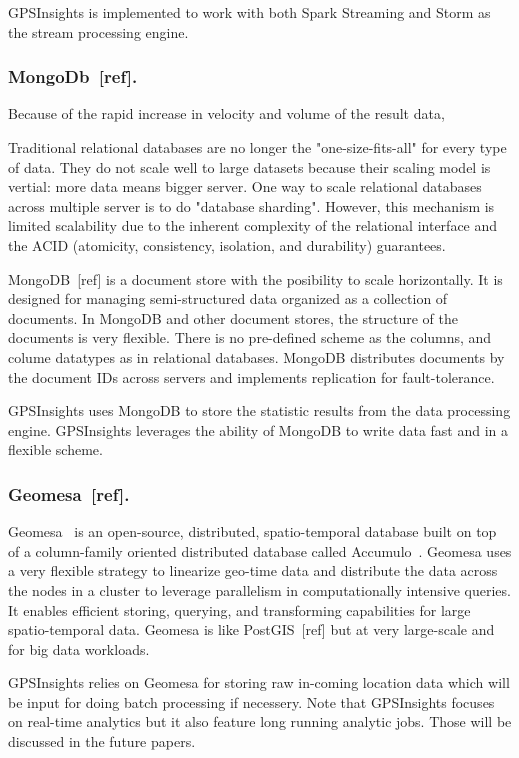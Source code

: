 \documentclass{acm_proc_article-sp}
\begin{document}
GPSInsights is implemented to work with both Spark Streaming and Storm as the stream processing engine.


\subsubsection{MongoDb~[ref].}


Because of the rapid increase in velocity and volume of the result data, 

Traditional relational databases are no longer the "one-size-fits-all" for every type of data. They do not scale well to large datasets because their scaling model is vertial: more data means bigger server. One way to scale relational databases across multiple server is to do "database sharding". However, this mechanism is limited scalability due to the inherent complexity of the relational interface and the ACID (atomicity, consistency, isolation, and durability) guarantees. 

MongoDB~[ref] is a document store with the posibility to scale horizontally. It is designed for managing semi-structured data organized as a collection of documents. In MongoDB and other document stores, the structure of the documents is very flexible. There is no pre-defined scheme as the columns, and colume datatypes as in relational databases. MongoDB distributes documents by the document IDs across servers and implements replication for fault-tolerance. 

GPSInsights uses MongoDB to store the statistic results from the data processing engine. GPSInsights leverages the ability of MongoDB to write data fast and in a flexible scheme. 

\subsubsection{Geomesa~[ref].}
 
 Geomesa~\cite{fox2013spatio} is an open-source, distributed, spatio-temporal database  built on top of a column-family oriented distributed database called Accumulo~\cite{accumuloonline}. Geomesa uses a very flexible strategy to linearize geo-time data and distribute the data across the nodes in a cluster to leverage parallelism in computationally intensive queries. It enables efficient storing, querying, and transforming capabilities for large spatio-temporal data. Geomesa is like PostGIS~[ref] but at very large-scale and for big data workloads. 

GPSInsights relies on Geomesa for storing raw in-coming location data which will be input for doing batch processing if necessery. Note that GPSInsights focuses on real-time analytics but it also feature long running analytic jobs. Those will be discussed in the future papers. 
\end{document}
